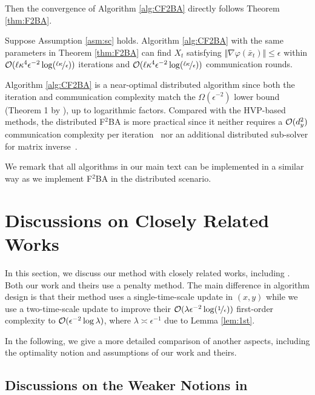 Then the convergence of Algorithm \ref{alg:CF2BA} directly follows Theorem \ref{thm:F2BA}.
\begin{cor} \label{cor:CF2BA}
Suppose Assumption \ref{asm:sc} holds.
Algorithm \ref{alg:CF2BA} with the same parameters in Theorem \ref{thm:F2BA} can find  $X_t$ satisfying $ \Vert \nabla \varphi(\bar x_t) \Vert \le \epsilon $ within ${\mathcal{O}}(\ell \kappa^4 \epsilon^{-2} \log(\nicefrac{\ell \kappa}{\epsilon})) $ {iterations} and  ${\mathcal{O}}( \ell \kappa^4 \epsilon^{-2} \log(\nicefrac{\ell \kappa}{\epsilon})) $ communication rounds.
\end{cor}

Algorithm \ref{alg:CF2BA} is a near-optimal distributed algorithm since both the iteration and communication complexity match the $\Omega(\epsilon^{-2})$ lower bound (Theorem 1 by \citet{lu2021optimal}), up to logarithmic factors.
Compared with the HVP-based methods, the distributed F${}^2$BA is more
practical since it
neither requires a ${\mathcal{O}}(d_y^2)$ communication complexity per iteration~\citep{yangdecentralized} nor an additional distributed sub-solver for matrix inverse~\citep{tarzanagh2022fednest,chen2022decentralized}. 

{We remark that all algorithms in our main text can be implemented in a similar way as we implement F${}^2$BA in the distributed scenario.
}

\section{Discussions on Closely Related Works}

In this section, we discuss our method with closely related works, including \citep{shen2023penalty,kwon2023fully}.
Both our work and theirs use a penalty method. 
The main difference in algorithm design is that their method uses a single-time-scale update in $(x,y)$ while we use a two-time-scale update to improve their ${\mathcal{O}}( \lambda \epsilon^{-2} \log(\nicefrac{1}{\epsilon}))$ first-order complexity to ${\mathcal{O}}(\epsilon^{-2} \log \lambda )$, where $\lambda \asymp \epsilon^{-1}$ due to Lemma \ref{lem:1st}.

In the following, we give a more detailed comparison of another aspects, including the optimality notion and assumptions of our work and theirs.

\subsection{Discussions on the Weaker Notions in \citep{shen2023penalty}} \label{apx:diss-shen}

